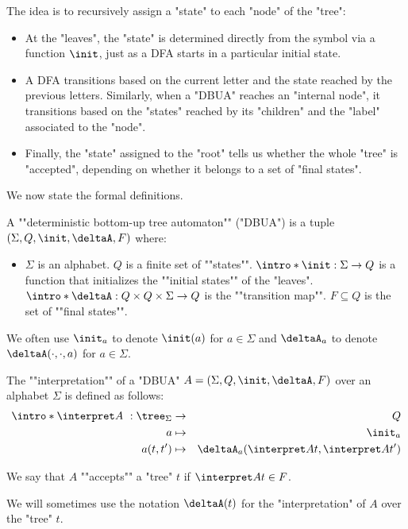 \documentclass[a4paper,UKenglish,cleveref, autoref, thm-restate]{lipics-v2021}
\begin{document}
The idea is to recursively assign a "state" to each "node" of the "tree":
\begin{itemize}
	\item At the "leaves", the "state" is determined directly from the symbol via a function $\init$, just as a DFA starts in a particular initial state.
	\item A DFA transitions based on the current letter and the state reached by the previous letters.
	      Similarly, when a "DBUA" reaches an "internal node", it transitions based on the "states" reached by its "children" and the "label" associated to the "node".
	\item Finally, the "state" assigned to the "root" tells us whether the whole "tree" is "accepted",
	      depending on whether it belongs to a set of "final states".
\end{itemize}

We now state the formal definitions.

\begin{definition}
	\AP A ""deterministic bottom-up tree automaton"" (\reintro*"DBUA") is a tuple $(\Sigma, Q, \init, \deltaA, F)$ where:
	\begin{itemize}
		\item $\Sigma$ is an alphabet.
		      \itemAP $Q$ is a finite set of ""states"".
		      \itemAP $\intro*\init : \Sigma \to Q$ is a function that initializes the ""initial states"" of the "leaves".
		      \itemAP $\intro*\deltaA : Q \times Q \times \Sigma \to Q$ is the ""transition map"".
		      \itemAP $F \subseteq Q$ is the set of ""final states"".
	\end{itemize}
    We often use $\init_a$ to denote $\init(a)$ for $a \in \Sigma$ and $\deltaA_a$ to denote $\deltaA(\cdot, \cdot, a)$ for $a \in \Sigma$.
\end{definition}

\begin{definition}
	\AP The ""interpretation"" of a "DBUA" $A = (\Sigma, Q, \init, \deltaA, F)$  over an alphabet $\Sigma$ is defined as follows:
	\begin{eqnarray*}
		\intro* \interpret A ~: \tree_{\Sigma} &\to& Q \\
		a &\mapsto& \init_a \\
		a(t,t') &\mapsto& \deltaA_a (\interpret A t, \interpret A {t'})
	\end{eqnarray*}

	We say that $A$ ""accepts"" a "tree" $t$ if $\interpret A t \in F$.

	We will sometimes use the notation $\deltaA(t)$ for the "interpretation" of $A$ over the "tree" $t$.
\end{definition}
\end{document}
